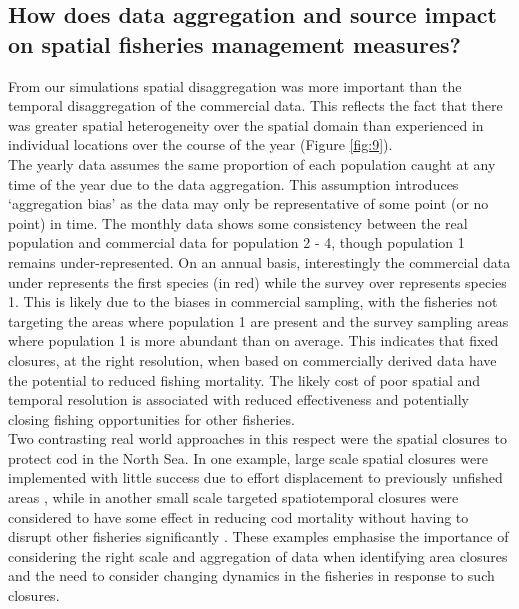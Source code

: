 \documentclass[review]{elsarticle}
\begin{document}
\subsection{How does data aggregation and source impact on spatial fisheries
	management measures?}

From our simulations spatial disaggregation was more important than the
temporal disaggregation of the commercial data. This reflects the fact that
there was greater spatial heterogeneity over the spatial domain than
experienced in individual locations over the course of the year (Figure
\ref{fig:9}). \\ 

The yearly data assumes the same proportion of each population caught at any
time of the year due to the data aggregation. This assumption introduces
`aggregation bias' as the data may only be representative of some point (or no
point) in time. The monthly data shows some consistency between the real
population and commercial data for population 2 - 4, though population 1 remains
under-represented.  On an annual basis, interestingly the commercial data under
represents the first species (in red) while the survey over represents species
1. This is likely due to the biases in commercial sampling, with the fisheries
not targeting the areas where population 1 are present and the survey sampling
areas where population 1 is more abundant than on average. This indicates that
fixed closures, at the right resolution, when based on commercially derived
data have the potential to reduced fishing mortality. The likely cost of poor
spatial and temporal resolution is associated with reduced effectiveness and
potentially closing fishing opportunities for other fisheries. \\

Two contrasting real world approaches in this respect were the spatial closures
to protect cod in the North Sea. In one example, large scale spatial closures
were implemented with little success due to effort displacement to previously
unfished areas \citep{Dinmore2003}, while in another small scale targeted
spatiotemporal closures were considered to have some effect in reducing cod
mortality without having to disrupt other fisheries significantly
\citep{Needle2011}. These examples emphasise the importance of considering the
right scale and aggregation of data when identifying area closures and the need
to consider changing dynamics in the fisheries in response to such closures. \\
\end{document}
